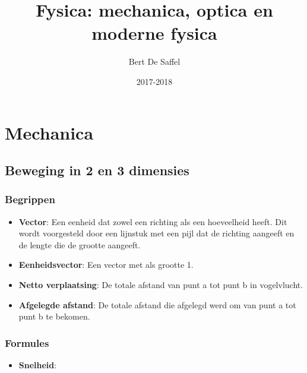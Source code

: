 \documentclass[12pt]{report}
\title{Fysica: mechanica, optica en moderne fysica}
\author{Bert De Saffel}
\date{2017-2018}
\newcommand{\important}[1] {\textbf{\color{orange}#1}}
\begin{document}
\maketitle
\tableofcontents

\part{Mechanica}
\chapter{Beweging in 2 en 3 dimensies}
\section{Begrippen}
\begin{itemize}
\item {\important{Vector}: Een eenheid dat zowel een richting als een hoeveelheid heeft. Dit wordt voorgesteld door een lijnstuk met een pijl dat de richting aangeeft en de lengte die de grootte aangeeft.}
\item {\important{Eenheidsvector}: Een vector met als grootte 1.}
\item {\important{Netto verplaatsing}: De totale afstand van punt a tot punt b in vogelvlucht.}
\item {\important{Afgelegde afstand}: De totale afstand die afgelegd werd om van punt a tot punt b te bekomen.}
\end{itemize}

\section{Formules}
\begin{itemize}
  \item {\important{Snelheid}: }
\end{itemize}
\end{document}
